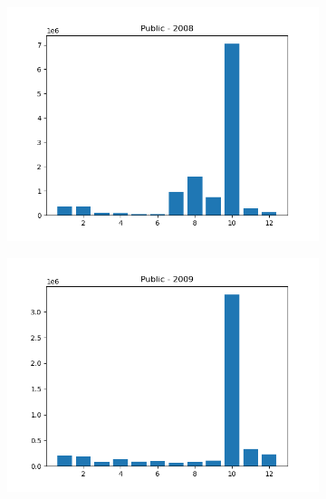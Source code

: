 \documentclass{article}
\begin{document}
\begin{figure}[H]
\begin{subfigure}{.5\textwidth}
    \end{subfigure}
    \begin{subfigure}{.5\textwidth}
        \centering
        \includegraphics[width=\textwidth]{../../output/figures/annual_source_distribution/Public_data_dist_2008.png}
    \end{subfigure}
    \begin{subfigure}{.5\textwidth}
        \centering
        \includegraphics[width=\textwidth]{../../output/figures/annual_source_distribution/Public_data_dist_2009.png}
    \end{subfigure}
    \begin{subfigure}{.5\textwidth}
        \centering

\end{subfigure}
\end{figure}
\end{document}
